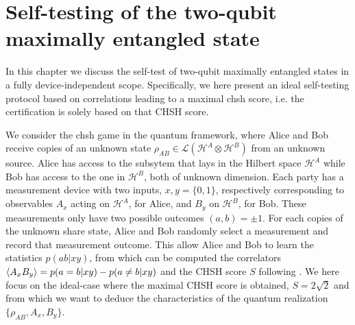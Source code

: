 \chapter{Self-testing of the two-qubit maximally entangled state}
\label{chap:selftesting}

In this chapter we discuss the self-test of two-qubit maximally entangled states in a fully device-independent scope.
Specifically, we here present an ideal self-testing protocol based on correlations leading to a maximal \acrshort{chsh} score, i.e. the certification is solely based on that CHSH score.

\medbreak 

We consider the \acrshort{chsh} game in the quantum framework, where Alice and Bob receive copies of an unknown state $\rho_{AB} \in \mathcal{L}(\mathscr{H}^A \otimes \mathscr{H}^B)$ from an unknown source.
Alice has access to the subsytem that lays in the Hilbert space $\mathscr{H}^A$ while Bob has access to the one in $\mathscr{H}^B$, both of unknown dimension.
Each party has a measurement device with two inputs, $x,y=\{0,1\}$, respectively corresponding to observables $A_x$ acting on $\mathscr{H}^A$, for Alice, and $B_y$ on $\mathscr{H}^B$, for Bob.
These measurements only have two possible outcomes $(a,b)=\pm1$.
For each copies of the unknown share state, Alice and Bob randomly select a measurement and record that measurement outcome. 
This allow Alice and Bob to learn the statistics $p(ab|xy)$, from which can be computed the correlators $\langle {A_x B_y} \rangle = p(a=b|xy)-p(a\neq b| xy)$ and the CHSH score $S$ following . 
We here focus on the ideal-case where the maximal CHSH score is obtained, $S=2\sqrt{2}$ and from which we want to deduce the characteristics of the quantum realization $\{\rho_{AB},A_x,B_y\}$.

\medbreak

